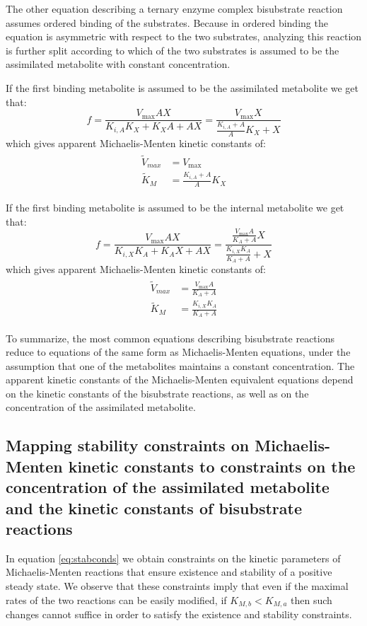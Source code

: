   The other equation describing a ternary enzyme complex  bisubstrate reaction assumes ordered binding of the substrates.
  Because in ordered binding the equation is asymmetric with respect to the two substrates, analyzing this reaction is further split according to which of the two substrates is assumed to be the assimilated metabolite with constant concentration.

  If the first binding metabolite is assumed to be the assimilated metabolite we get that:
  \begin{equation}
      \label{eq:biordfstmm}
      f=\frac{V_{\max}AX}{K_{i,A}K_X+K_XA+AX}=\frac{V_{\max}X}{\frac{K_{i,A}+A}{A}K_X+X}
  \end{equation}
  which gives apparent Michaelis-Menten kinetic constants of:
  \begin{align}
  \begin{split}
      \label{eq:paramsasymfst}
      \tilde{V}_{max}&=V_{\max} \\
      \tilde{K}_M&=\frac{K_{i,A}+A}{A}K_X
  \end{split}
  \end{align}

  If the first binding metabolite is assumed to be the internal metabolite we get that:
  \begin{equation}
      \label{eq:biordsndmm}
      f=\frac{V_{\max}AX}{K_{i,X}K_A+K_AX+AX}=\frac{\frac{V_{\max}A}{K_A+A}X}{\frac{K_{i,X}K_A}{K_A+A}+X}
  \end{equation}
  which gives apparent Michaelis-Menten kinetic constants of:
  \begin{align}
  \begin{split}
      \label{eq:paramsasymsnd}
      \tilde{V}_{max}&=\frac{V_{\max}A}{K_A+A} \\
      \tilde{K}_M&=\frac{K_{i,X}K_A}{K_A+A}
  \end{split}
  \end{align}

  To summarize, the most common equations describing bisubstrate reactions reduce to equations of the same form as Michaelis-Menten equations, under the assumption that one of the metabolites maintains a constant concentration.
  The apparent kinetic constants of the Michaelis-Menten equivalent equations depend on the kinetic constants of the bisubstrate reactions, as well as on the concentration of the assimilated metabolite.

  \subsection{Mapping stability constraints on Michaelis-Menten kinetic constants to constraints on the concentration of the assimilated metabolite and the kinetic constants of bisubstrate reactions}
  In equation \ref{eq:stabconds} we obtain constraints on the kinetic parameters of Michaelis-Menten reactions that ensure existence and stability of a positive steady state.
  We observe that these constraints imply that even if the maximal rates of the two reactions can be easily modified, if $K_{M,b}<K_{M,a}$ then such changes cannot suffice in order to satisfy the existence and stability constraints.

